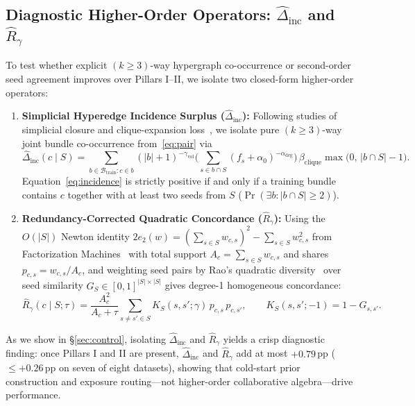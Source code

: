 \subsection{Diagnostic Higher-Order Operators: $\hat{\Delta}_{\text{inc}}$ and $\hat{R}_{\gamma}$}
\label{sec:incidence}
\label{sec:concordance}
To test whether explicit $(k\ge 3)$-way hypergraph co-occurrence or second-order seed agreement improves over
Pillars I--II, we isolate two closed-form higher-order operators:
\begin{enumerate}\itemsep1pt
  \item \textbf{Simplicial Hyperedge Incidence Surplus ($\hat{\Delta}_{\text{inc}}$):} Following studies of
  simplicial closure and clique-expansion loss~\cite{benson2018,ebli2020,prokopchik2022,lee2024}, we isolate pure
  $(k\ge 3)$-way joint bundle co-occurrence from~\eqref{eq:pair} via
  \begin{equation}
    \hat{\Delta}_{\text{inc}}(c\mid S)
    = \sum_{b \in \mathcal{B}_{\text{train}} : c \in b}
      (|b|+1)^{-\gamma_{\text{vol}}}
      \Big(\sum_{s\in b\cap S}(f_s+\alpha_0)^{-\alpha_{\text{deg}}}\Big)\,
      \beta_{\text{clique}}\max\!\big(0,\,|b\cap S|-1\big).
    \label{eq:incidence}
  \end{equation}
  Equation~\eqref{eq:incidence} is strictly positive if and only if a training bundle contains $c$ together with at
  least two seeds from $S$ ($\Pr(\exists b : |b\cap S|\ge 2)$).
  \item \textbf{Redundancy-Corrected Quadratic Concordance ($\hat{R}_{\gamma}$):} Using the $O(|S|)$ Newton identity
  $2e_2(w) = (\sum_{s\in S} w_{c,s})^2 - \sum_{s\in S} w_{c,s}^2$ from Factorization
  Machines~\cite{rendle2010,blondel2016} with total support $A_c = \sum_{s\in S} w_{c,s}$ and shares
  $p_{c,s} = w_{c,s}/A_c$, and weighting seed pairs by Rao's quadratic diversity~\cite{rao1982} over seed
  similarity $G_S \in [0,1]^{|S|\times|S|}$ gives degree-1 homogeneous concordance:
  \begin{equation}
    \hat{R}_{\gamma}(c\mid S;\tau)
    = \frac{A_c^2}{A_c + \tau} \sum_{s\neq s'\in S} K_S(s,s';\gamma)\,p_{c,s}\,p_{c,s'},
    \qquad K_S(s,s';-1) = 1 - G_{s,s'}.
    \label{eq:rao}
  \end{equation}
\end{enumerate}
As we show in \S\ref{sec:control}, isolating $\hat{\Delta}_{\text{inc}}$ and $\hat{R}_{\gamma}$ yields a crisp
diagnostic finding: once Pillars I and II are present, $\hat{\Delta}_{\text{inc}}$ and $\hat{R}_{\gamma}$ add at most
$+0.79$\,pp (${\le}+0.26$\,pp on seven of eight datasets), showing that cold-start prior construction and exposure routing---not higher-order
collaborative algebra---drive performance.

